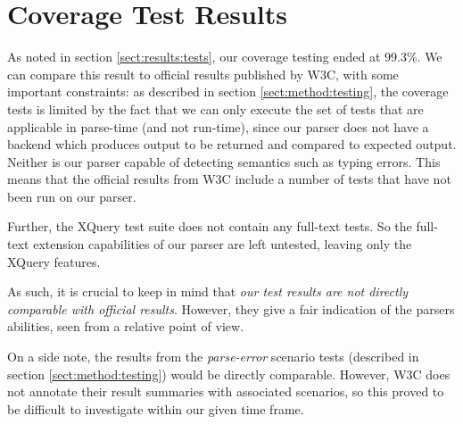 \section{Coverage Test Results}
\label{sect:discussion:coverageResults}
As noted in section \ref{sect:results:tests}, our coverage testing ended at 
99.3\%. We can compare this result to official results published by W3C, with
some  important constraints: as described in section \ref{sect:method:testing},
the coverage tests is limited by the fact that we can only execute the set of
tests that are applicable in parse-time (and not run-time), since our parser
does not have a backend which produces output to be returned and compared to
expected output. Neither is our parser capable of detecting semantics such as
typing errors. This means that the official results from W3C include a number
of tests that have not been run on our parser.

Further, the XQuery test suite does not contain any full-text tests. So the
full-text extension capabilities of our parser are left untested, leaving only the XQuery features.

As such, it is crucial to keep in mind that \emph{our test results are not directly
comparable with official results}. However, they give a fair indication of the
parsers abilities, seen from a relative point of view.

On a side note, the results from the \emph{parse-error} scenario tests
(described in  section \ref{sect:method:testing}) would be directly comparable.
However, W3C does not annotate their result summaries with associated scenarios,
so this proved to be difficult to investigate within our given time frame.

